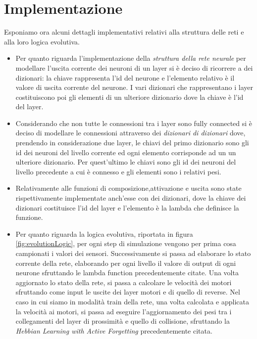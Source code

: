 \section{Implementazione}

Esponiamo ora alcuni dettagli implementativi relativi alla struttura delle reti e alla loro logica evolutiva. 

\begin{itemize}
    \item Per quanto riguarda l'implementazione della \textit{struttura della rete neurale} per modellare l'uscita corrente dei neuroni di un layer si è deciso di ricorrere a dei dizionari: la chiave rappresenta l'id del neurone e l'elemento relativo è il valore di uscita corrente del neurone.
    I vari dizionari che rappresentano i layer costituiscono poi gli elementi di un ulteriore dizionario dove la chiave è l'id del layer.
    
    \item Considerando che non tutte le connessioni tra i layer sono fully connected si è deciso di modellare le connessioni attraverso dei \textit{dizionari di dizionari} dove, prendendo in considerazione due layer, le chiavi del primo dizionario sono gli id dei neuroni del livello corrente ed ogni elemento corrisponde ad un un ulteriore dizionario. Per quest'ultimo le chiavi sono gli id dei neuroni del livello precedente a cui è connesso e gli elementi sono i relativi pesi.
    
    \item Relativamente alle funzioni di composizione,attivazione e uscita sono state rispettivamente implementate anch'esse con dei dizionari, dove la chiave dei dizionari costituisce l'id del layer e l'elemento è la lambda che definisce la funzione.
\end{itemize}

\begin{itemize}
    \item Per quanto riguarda la logica evolutiva, riportata in figura \ref{fig:evolutionLogic}, per ogni step di simulazione vengono per prima cosa campionati i valori dei sensori. Successivamente si passa ad elaborare lo stato corrente della rete, elaborando per ogni livello il valore di output di ogni neurone sfruttando le lambda function precedentemente citate. Una volta aggiornato lo stato della rete, si passa a calcolare le velocità dei motori sfruttando come input le uscite dei layer motori e di quello di reverse.
    Nel caso in cui siamo in modalità train della rete, una volta calcolata e applicata la velocità ai motori, si passa ad eseguire l'aggiornamento dei pesi tra i collegamenti del layer di prossimità e quello di collisione, sfruttando la \textit{Hebbian Learning with Active Forgetting} precedentemente citata.
\end{itemize}


